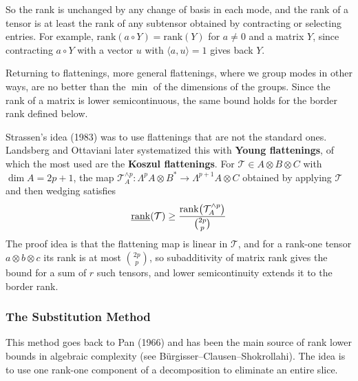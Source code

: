     So the rank is unchanged by any change of basis in each mode, and the rank of a tensor is at least the rank of any subtensor obtained by contracting or selecting entries. For example, $\mathrm{rank}(a \circ Y) = \mathrm{rank}(Y)$ for $a \neq 0$ and a matrix $Y$, since contracting $a \circ Y$ with a vector $u$ with $\langle a, u \rangle = 1$ gives back $Y$. 

    Returning to flattenings, more general flattenings, where we group modes in other ways, are no better than the $\min$ of the dimensions of the groups. Since the rank of a matrix is lower semicontinuous, the same bound holds for the border rank defined below.

    Strassen's idea (1983) was to use flattenings that are not the standard ones. Landsberg and Ottaviani later systematized this with \textbf{Young flattenings}, of which the most used are the \textbf{Koszul flattenings}. For $\mathcal{T} \in A \otimes B \otimes C$ with $\dim A = 2p+1$, the map $\mathcal{T}_A^{\wedge p} : \Lambda^p A \otimes B^* \to \Lambda^{p+1} A \otimes C$ obtained by applying $\mathcal{T}$ and then wedging satisfies
    \begin{equation}
      \underline{\mathrm{rank}}(\mathcal{T}) \geq \frac{\mathrm{rank}\big(\mathcal{T}_A^{\wedge p}\big)}{\binom{2p}{p}}
    \end{equation}
    The proof idea is that the flattening map is linear in $\mathcal{T}$, and for a rank-one tensor $a \otimes b \otimes c$ its rank is at most $\binom{2p}{p}$, so subadditivity of matrix rank gives the bound for a sum of $r$ such tensors, and lower semicontinuity extends it to the border rank.

  \subsubsection{The Substitution Method}

    This method goes back to Pan (1966) and has been the main source of rank lower bounds in algebraic complexity (see Bürgisser--Clausen--Shokrollahi). The idea is to use one rank-one component of a decomposition to eliminate an entire slice.

